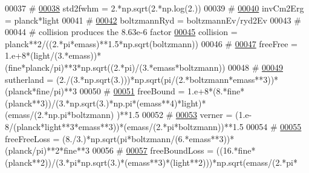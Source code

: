 \begin{DoxyCode}
00037 \textcolor{comment}{#}
\hypertarget{__chianti__constants_8py_source_l00038}{}\hyperlink{namespacepyneb_1_1utils_1_1__chianti__constants_aa3ee9d102b81039a0142254fbf5eb8fe}{00038} std2fwhm = 2.*np.sqrt(2.*np.log(2.))
00039 \textcolor{comment}{#}
\hypertarget{__chianti__constants_8py_source_l00040}{}\hyperlink{namespacepyneb_1_1utils_1_1__chianti__constants_a6e27225d6b76f3f489d31098bb0206e4}{00040} invCm2Erg = planck*light
00041 \textcolor{comment}{#}
\hypertarget{__chianti__constants_8py_source_l00042}{}\hyperlink{namespacepyneb_1_1utils_1_1__chianti__constants_a5f93fd86cb8c071266138f93ee209d00}{00042} boltzmannRyd = boltzmannEv/ryd2Ev
00043 \textcolor{comment}{#}
00044 \textcolor{comment}{# collision produces the 8.63e-6 factor}
\hypertarget{__chianti__constants_8py_source_l00045}{}\hyperlink{namespacepyneb_1_1utils_1_1__chianti__constants_a66316d73d0acee3da0950278c48f8060}{00045} collision = planck**2/((2.*pi*emass)**1.5*np.sqrt(boltzmann))
00046 \textcolor{comment}{#}
\hypertarget{__chianti__constants_8py_source_l00047}{}\hyperlink{namespacepyneb_1_1utils_1_1__chianti__constants_acb6e045304d6339f57d58214db1f2395}{00047} freeFree = 1.e+8*(light/(3.*emass))*(fine*planck/pi)**3*np.sqrt((2.*pi)/(3.*emass*boltzmann))
00048 \textcolor{comment}{#}
\hypertarget{__chianti__constants_8py_source_l00049}{}\hyperlink{namespacepyneb_1_1utils_1_1__chianti__constants_ae948d4e5d259213534b8373b3819e39a}{00049} sutherland = (2./(3.*np.sqrt(3.)))*np.sqrt(pi/(2.*boltzmann*emass**3))*(planck*fine/pi)**3
00050 \textcolor{comment}{#}
\hypertarget{__chianti__constants_8py_source_l00051}{}\hyperlink{namespacepyneb_1_1utils_1_1__chianti__constants_a4850755bf23aaa9a52f838e54df62a7d}{00051} freeBound = 1.e+8*(8.*fine*(planck**3))/(3.*np.sqrt(3.)*np.pi*(emass**4)*light)*(emass/(2.*np.pi*boltzmann)
      )**1.5
00052 \textcolor{comment}{#}
\hypertarget{__chianti__constants_8py_source_l00053}{}\hyperlink{namespacepyneb_1_1utils_1_1__chianti__constants_a8b5b3de48de538cfc793e5a020de12e3}{00053} verner = (1.e-8/(planck*light**3*emass**3))*(emass/(2.*pi*boltzmann))**1.5
00054 \textcolor{comment}{#}
\hypertarget{__chianti__constants_8py_source_l00055}{}\hyperlink{namespacepyneb_1_1utils_1_1__chianti__constants_a46456dd338306ad50b0995e659d51645}{00055} freeFreeLoss = (8./3.)*np.sqrt(pi*boltzmann/(6.*emass**3))*(planck/pi)**2*fine**3
00056 \textcolor{comment}{#}
\hypertarget{__chianti__constants_8py_source_l00057}{}\hyperlink{namespacepyneb_1_1utils_1_1__chianti__constants_a06c463c09c59b15c44e8e6a405bd81dc}{00057} freeBoundLoss = ((16.*fine*(planck**2))/(3.*pi*np.sqrt(3.)*(emass**3)*(light**2)))*np.sqrt(emass/(2.*pi*

\end{DoxyCode}
